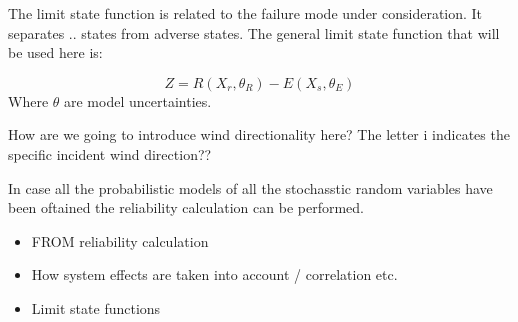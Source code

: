 The limit state function is related to the failure mode under consideration. It separates .. states from adverse states. 
The general limit state function that will be used here is:

\begin{equation}
Z = R(X_r, \theta_R) - E(X_s, \theta_E)
\end{equation}
Where $\theta$ are model uncertainties. 


\begin{framed}
How are we going to introduce wind directionality here? The letter i indicates the specific incident wind direction??
\end{framed}


In case all the probabilistic models of all the stochasstic random variables have been oftained the reliability calculation can be performed. 
\begin{itemize}
	\item FROM reliability calculation
	\item How system effects are taken into account / correlation etc.
	\item Limit state functions
\end{itemize}





%

